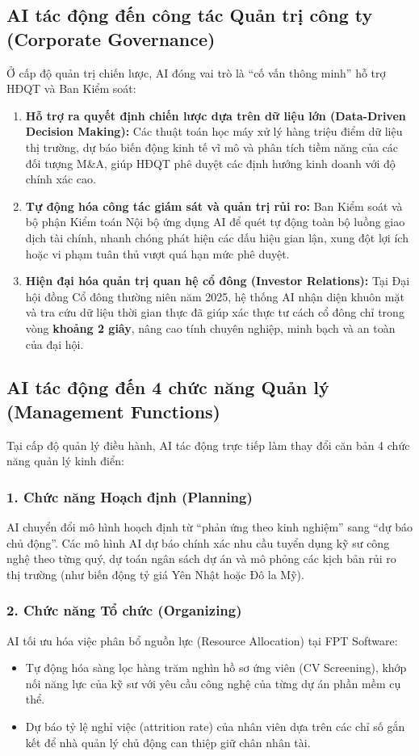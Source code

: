 \subsection{AI tác động đến công tác Quản trị công ty (Corporate Governance)}
Ở cấp độ quản trị chiến lược, AI đóng vai trò là ``cố vấn thông minh'' hỗ trợ HĐQT và Ban Kiểm soát:
\begin{enumerate}
    \item \textbf{Hỗ trợ ra quyết định chiến lược dựa trên dữ liệu lớn (Data-Driven Decision Making):} Các thuật toán học máy xử lý hàng triệu điểm dữ liệu thị trường, dự báo biến động kinh tế vĩ mô và phân tích tiềm năng của các đối tượng M\&A, giúp HĐQT phê duyệt các định hướng kinh doanh với độ chính xác cao.
    \item \textbf{Tự động hóa công tác giám sát và quản trị rủi ro:} Ban Kiểm soát và bộ phận Kiểm toán Nội bộ ứng dụng AI để quét tự động toàn bộ luồng giao dịch tài chính, nhanh chóng phát hiện các dấu hiệu gian lận, xung đột lợi ích hoặc vi phạm tuân thủ vượt quá hạn mức phê duyệt.
    \item \textbf{Hiện đại hóa quản trị quan hệ cổ đông (Investor Relations):} Tại Đại hội đồng Cổ đông thường niên năm 2025, hệ thống AI nhận diện khuôn mặt và tra cứu dữ liệu thời gian thực đã giúp xác thực tư cách cổ đông chỉ trong vòng \textbf{khoảng 2 giây}, nâng cao tính chuyên nghiệp, minh bạch và an toàn của đại hội.
\end{enumerate}

\subsection{AI tác động đến 4 chức năng Quản lý (Management Functions)}
Tại cấp độ quản lý điều hành, AI tác động trực tiếp làm thay đổi căn bản 4 chức năng quản lý kinh điển:

\subsubsection{1. Chức năng Hoạch định (Planning)}
AI chuyển đổi mô hình hoạch định từ ``phản ứng theo kinh nghiệm'' sang ``dự báo chủ động''. Các mô hình AI dự báo chính xác nhu cầu tuyển dụng kỹ sư công nghệ theo từng quý, dự toán ngân sách dự án và mô phỏng các kịch bản rủi ro thị trường (như biến động tỷ giá Yên Nhật hoặc Đô la Mỹ).

\subsubsection{2. Chức năng Tổ chức (Organizing)}
AI tối ưu hóa việc phân bổ nguồn lực (Resource Allocation) tại FPT Software:
\begin{itemize}
    \item Tự động hóa sàng lọc hàng trăm nghìn hồ sơ ứng viên (CV Screening), khớp nối năng lực của kỹ sư với yêu cầu công nghệ của từng dự án phần mềm cụ thể.
    \item Dự báo tỷ lệ nghỉ việc (attrition rate) của nhân viên dựa trên các chỉ số gắn kết để nhà quản lý chủ động can thiệp giữ chân nhân tài.
\end{itemize}

